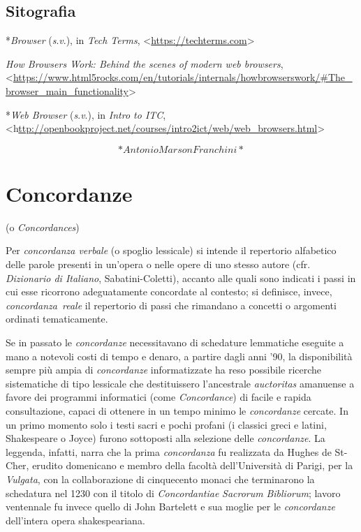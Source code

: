 \documentclass[
  b5paper,
  twoside,
  11pt,
  chapterprefix=false,
  bibliography=totocnumbered,
  listof=flat]{scrbook}
\begin{document}
\hypertarget{sitografia-3}{%
\section*{Sitografia}\label{sitografia-3}}

*\emph{Browser} (\emph{s}.\emph{v}.), in \emph{Tech Terms},
\textless{}{\href{https://techterms.com/}{https://techterms.com}\textgreater{}}

\emph{How Browsers Work: Behind the scenes of modern web browsers},
\textless{}{\url{https://www.html5rocks.com/en/tutorials/internals/howbrowserswork/\#The_browser_main_functionality}\textgreater{}}

*\emph{Web Browser} (\emph{s}.\emph{v}.), in \emph{Intro to ITC},
\textless{}{h\href{http://openbookproject.net/courses/intro2ict/web/web_browsers.html}{ttp://openbookproject.net/courses/intro2ict/web/web\_browsers.html}\textgreater{}}

\[*Antonio Marson Franchini*\]

\hypertarget{concordanze}{%
\chapter{Concordanze}\label{concordanze}}

(o \emph{Concordances})

Per \emph{concordanza verbale} (o spoglio lessicale) si intende il repertorio
alfabetico delle parole presenti in un'opera o nelle opere di uno stesso
autore (cfr. \emph{Dizionario di Italiano}, Sabatini-Coletti), accanto alle
quali sono indicati i passi in cui esse ricorrono adeguatamente
concordate al contesto; si definisce, invece, \emph{concordanza~reale} il
repertorio di passi che rimandano a concetti o argomenti ordinati
tematicamente.

Se in passato le \emph{concordanze} necessitavano di schedature lemmatiche
eseguite a mano a notevoli costi di tempo e denaro, a partire dagli anni
'90, la disponibilità sempre più ampia di \emph{concordanze} informatizzate
ha reso possibile ricerche sistematiche di tipo lessicale che
destituissero l'ancestrale \emph{auctoritas} amanuense a favore dei programmi
informatici (come \emph{Concordance}) di facile e rapida consultazione,
capaci di ottenere in un tempo minimo le \emph{concordanze} cercate. In un
primo momento solo i testi sacri e pochi profani (i classici greci e
latini, Shakespeare o Joyce) furono sottoposti alla selezione delle
\emph{concordanze}. La leggenda, infatti, narra che la prima \emph{concordanza} fu
realizzata da Hughes de St-Cher, erudito domenicano e membro della
facoltà dell'Università di Parigi, per la \emph{Vulgata}, con la
collaborazione di cinquecento monaci che terminarono la schedatura nel
1230 con il titolo di \emph{Concordantiae} \emph{Sacrorum} \emph{Bibliorum}; lavoro
ventennale fu invece quello di John Bartelett e sua moglie per le
\emph{concordanze} dell'intera opera shakespeariana.
\end{document}

